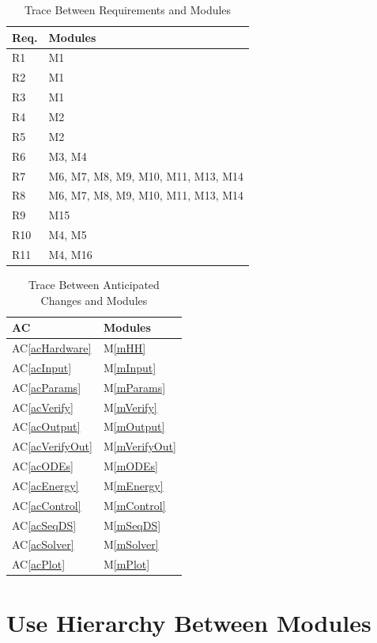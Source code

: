 \documentclass[12pt, titlepage]{article}
\newcommand{\acref}[1]{AC\ref{#1}}
\newcommand{\mref}[1]{M\ref{#1}}
\begin{document}
\begin{table}[H]
\centering
\begin{tabular}{p{} p{}}
\toprule
\textbf{Req.} & \textbf{Modules}\\
\midrule
R1 & M1 \\
R2 & M1 \\
R3 & M1 \\
R4 & M2 \\
R5 & M2 \\
R6 & M3, M4 \\
R7 & M6, M7, M8, M9, M10, M11, M13, M14 \\
R8 & M6, M7, M8, M9, M10, M11, M13, M14 \\
R9 & M15\\
R10 & M4, M5\\
R11 & M4, M16\\
\bottomrule
\end{tabular}
\caption{Trace Between Requirements and Modules}
\label{TblRT}
\end{table}

\begin{table}[H]
\centering
\begin{tabular}{p{} p{}}
\toprule
\textbf{AC} & \textbf{Modules}\\
\midrule
\acref{acHardware} & \mref{mHH}\\
\acref{acInput} & \mref{mInput}\\
\acref{acParams} & \mref{mParams}\\
\acref{acVerify} & \mref{mVerify}\\
\acref{acOutput} & \mref{mOutput}\\
\acref{acVerifyOut} & \mref{mVerifyOut}\\
\acref{acODEs} & \mref{mODEs}\\
\acref{acEnergy} & \mref{mEnergy}\\
\acref{acControl} & \mref{mControl}\\
\acref{acSeqDS} & \mref{mSeqDS}\\
\acref{acSolver} & \mref{mSolver}\\
\acref{acPlot} & \mref{mPlot}\\
\bottomrule
\end{tabular}
\caption{Trace Between Anticipated Changes and Modules}
\label{TblACT}
\end{table}

\section{Use Hierarchy Between Modules} \label{SecUse}
\end{document}
